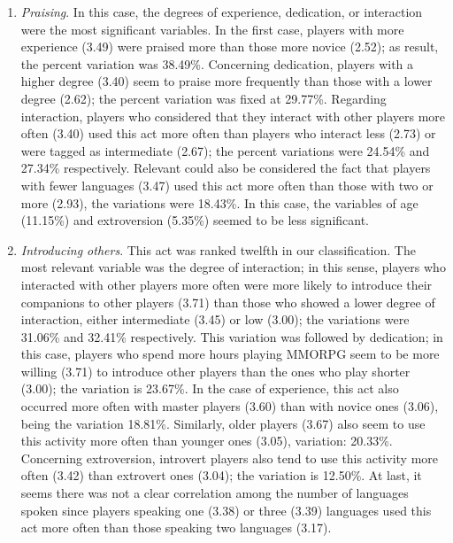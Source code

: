 \documentclass[english]{textolivre}
\begin{document}
\begin{enumerate}
\item \emph{Praising}. In this case, the degrees of experience, dedication, or interaction were the most significant variables. In the first case, players with more experience (3.49) were praised more than those more novice (2.52); as result, the percent variation was 38.49\%. Concerning dedication, players with a higher degree (3.40) seem to praise more frequently than those with a lower degree (2.62); the percent variation was fixed at 29.77\%. Regarding interaction, players who considered that they interact with other players more often (3.40) used this act more often than players who interact less (2.73) or were tagged as intermediate (2.67); the percent variations were 24.54\% and 27.34\% respectively. Relevant could also be considered the fact that players with fewer languages (3.47) used this act more often than those with two or more (2.93), the variations were 18.43\%. In this case, the variables of age (11.15\%) and extroversion (5.35\%) seemed to be less significant.
\item \emph{Introducing others}. This act was ranked twelfth in our classification. The most relevant variable was the degree of interaction; in this sense, players who interacted with other players more often were more likely to introduce their companions to other players (3.71) than those who showed a lower degree of interaction, either intermediate (3.45) or low (3.00); the variations were 31.06\% and 32.41\% respectively. This variation was followed by dedication; in this case, players who spend more hours playing MMORPG seem to be more willing (3.71) to introduce other players than the ones who play shorter (3.00); the variation is 23.67\%. In the case of experience, this act also occurred more often with master players (3.60) than with novice ones (3.06), being the variation 18.81\%. Similarly, older players (3.67) also seem to use this activity more often than younger ones (3.05), variation: 20.33\%. Concerning extroversion, introvert players also tend to use this activity more often (3.42) than extrovert ones (3.04); the variation is 12.50\%. At last, it seems there was not a clear correlation among the number of languages spoken since players speaking one (3.38) or three (3.39) languages used this act more often than those speaking two languages (3.17). 

\end{enumerate}
\end{document}
